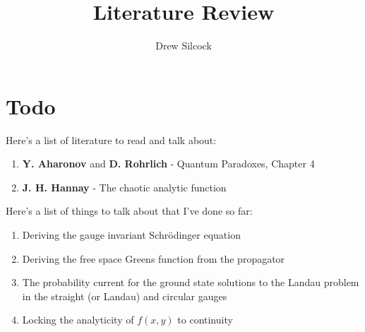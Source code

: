 \documentclass{article}
\title{Literature Review}
\author{Drew Silcock}
\date{}
\begin{document}
\maketitle

\section{Todo}

Here's a list of literature to read and talk about:

\begin{enumerate}
    \item \textbf{Y. Aharonov} and \textbf{D. Rohrlich} - Quantum Paradoxes, Chapter 4
    \item \textbf{J. H. Hannay} - The chaotic analytic function
\end{enumerate}

\noindent Here's a list of things to talk about that I've done so far:

\begin{enumerate}
    \item Deriving the gauge invariant Schr\"odinger equation
    \item Deriving the free space Greens function from the propagator
    \item The probability current for the ground state solutions to the Landau
        problem in the straight (or Landau) and circular gauges
    \item Locking the analyticity of $f(x,y)$ to continuity
\end{enumerate}

\nocite{*}


\end{document}
